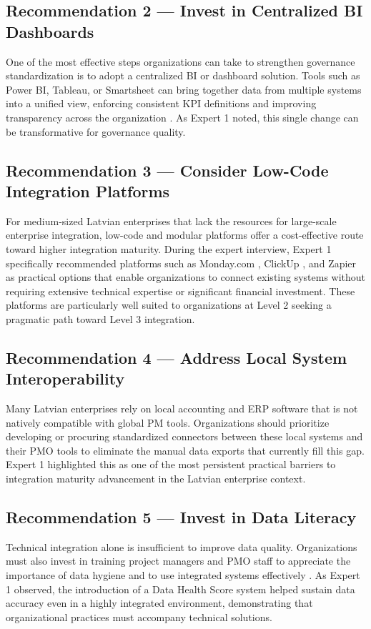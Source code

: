 \subsection{Recommendation 2 --- Invest in Centralized BI Dashboards}
One of the most effective steps organizations can take to strengthen
governance standardization is to adopt a centralized BI or dashboard
solution. Tools such as Power BI, Tableau, or Smartsheet can bring
together data from multiple systems into a unified view, enforcing
consistent KPI definitions and improving transparency across the
organization \cite{negash2004}. As Expert 1 noted, this single change
can be transformative for governance quality.

\subsection{Recommendation 3 --- Consider Low-Code Integration Platforms}
For medium-sized Latvian enterprises that lack the resources for
large-scale enterprise integration, low-code and modular platforms
offer a cost-effective route toward higher integration maturity.
During the expert interview, Expert 1 specifically recommended
platforms such as Monday.com \cite{monday2024}, ClickUp
\cite{clickup2024}, and Zapier \cite{zapier2024} as practical
options that enable organizations to connect existing systems without
requiring extensive technical expertise or significant financial
investment. These platforms are particularly well suited to
organizations at Level 2 seeking a pragmatic path toward Level 3
integration.

\subsection{Recommendation 4 --- Address Local System Interoperability}
Many Latvian enterprises rely on local accounting and ERP software
that is not natively compatible with global PM tools. Organizations
should prioritize developing or procuring standardized connectors
between these local systems and their PMO tools to eliminate the
manual data exports that currently fill this gap. Expert 1 highlighted
this as one of the most persistent practical barriers to integration
maturity advancement in the Latvian enterprise context.

\subsection{Recommendation 5 --- Invest in Data Literacy}
Technical integration alone is insufficient to improve data quality.
Organizations must also invest in training project managers and PMO
staff to appreciate the importance of data hygiene and to use
integrated systems effectively \cite{dama2017}. As Expert 1 observed,
the introduction of a Data Health Score system helped sustain data
accuracy even in a highly integrated environment, demonstrating that
organizational practices must accompany technical solutions.


